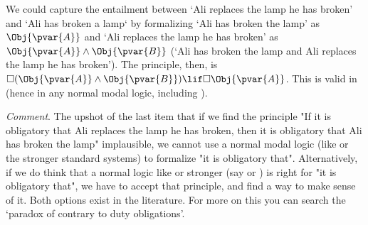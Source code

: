 \documentclass[../../../../include/open-logic-section]{subfiles}
\begin{document}
\begin{prob}
\begin{ans}
\begin{enumerate}
\begin{enumerate}
	We could capture the entailment between `Ali replaces the lamp he
	has broken' and `Ali has broken a lamp` by formalizing `Ali has
	broken the lamp' as $\Obj{\pvar{A}}$ and `Ali replaces the lamp he
	has broken' as $\Obj{\pvar{A}}\land \Obj{\pvar{B}}$ (`Ali has
	broken the lamp and Ali replaces the lamp he has broken'). The
	principle, then, is 
	$\Box(\Obj{\pvar{A}}\land \Obj{\pvar{B}})\lif\Box\Obj{\pvar{A}}$.
	This is valid in  (hence in any normal modal logic, 
	including ).

	\end{enumerate} 

	\emph{Comment}. The upshot of the last item that if we find the
	principle "If it is obligatory that Ali replaces the lamp he has
	broken, then it is obligatory that Ali has broken the lamp"
	implausible, we cannot use a normal modal logic (like  or
	the stronger standard systems) to formalize "it is obligatory
	that". Alternatively, if we do think that a normal logic like
	 or stronger (say  or ) is right for "it
	is obligatory that", we have to accept that principle, and find a
	way to make sense of it. Both options exist in the literature. 
	For more on this you can search the `paradox of contrary to duty
	obligations'. 

	\end{enumerate}

	\end{ans}

\end{prob}
\end{document}
